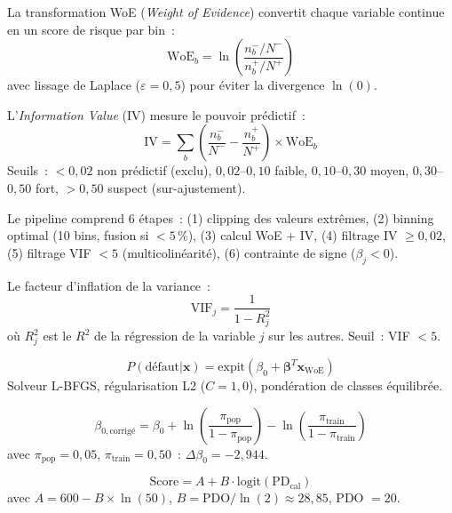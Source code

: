 \documentclass[10pt, a4paper, oneside]{report}
\theoremstyle{definition}
\begin{document}
La transformation WoE (\emph{Weight of Evidence}) convertit chaque variable continue en un score de risque par bin~:
\begin{equation}
\text{WoE}_b = \ln\!\left(\frac{n^-_b / N^-}{n^+_b / N^+}\right)
\label{eq:woe}
\end{equation}
avec lissage de Laplace ($\varepsilon = 0{,}5$) pour éviter la divergence $\ln(0)$.

L'\emph{Information Value} (IV) mesure le pouvoir prédictif~:
\begin{equation}
\text{IV} = \sum_b \left(\frac{n^-_b}{N^-} - \frac{n^+_b}{N^+}\right) \times \text{WoE}_b
\label{eq:iv}
\end{equation}
Seuils~: $< 0{,}02$ non prédictif (exclu), $0{,}02$--$0{,}10$ faible, $0{,}10$--$0{,}30$ moyen, $0{,}30$--$0{,}50$ fort, $> 0{,}50$ suspect (sur-ajustement).

Le pipeline comprend 6 étapes~: (1) clipping des valeurs extrêmes, (2) binning optimal (10 bins, fusion si $< 5\,\%$), (3) calcul WoE + IV, (4) filtrage IV $\geq 0{,}02$, (5) filtrage VIF $< 5$ (multicolinéarité), (6) contrainte de signe ($\beta_j < 0$).

Le facteur d'inflation de la variance~:
\begin{equation}
\text{VIF}_j = \frac{1}{1 - R_j^2}
\label{eq:vif}
\end{equation}
où $R_j^2$ est le $R^2$ de la régression de la variable $j$ sur les autres. Seuil~: VIF $< 5$.

\begin{equation}
P(\text{défaut} | \mathbf{x}) = \text{expit}(\beta_0 + \boldsymbol{\beta}^T \mathbf{x}_{\text{WoE}})
\label{eq:lr}
\end{equation}
Solveur L-BFGS, régularisation L2 ($C = 1{,}0$), pondération de classes équilibrée.

\begin{equation}
\beta_{0,\text{corrigé}} = \beta_0 + \ln\!\left(\frac{\pi_{\text{pop}}}{1 - \pi_{\text{pop}}}\right) - \ln\!\left(\frac{\pi_{\text{train}}}{1 - \pi_{\text{train}}}\right)
\label{eq:prior-correction}
\end{equation}
avec $\pi_{\text{pop}} = 0{,}05$, $\pi_{\text{train}} = 0{,}50$~: $\Delta\beta_0 = -2{,}944$.

\begin{equation}
\text{Score} = A + B \cdot \text{logit}(\text{PD}_{\text{cal}})
\label{eq:scorecard}
\end{equation}
avec $A = 600 - B \times \ln(50)$, $B = \text{PDO} / \ln(2) \approx 28{,}85$, PDO $= 20$.
\end{document}
